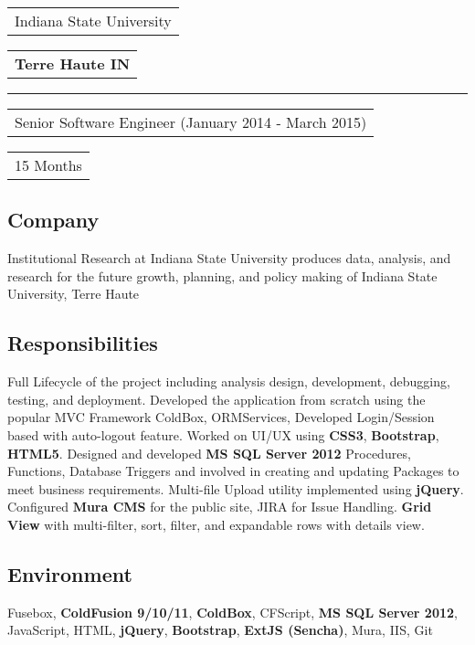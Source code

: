 \documentclass[letterpaper,11pt]{article}
\begin{document}
    \vspace{1.27cm}
    \noindent
    \begin{tabular}[t]{@{}l}
    \Large{Indiana State University}
    \end{tabular}
    \hfill
    \begin{tabular}[t]{l@{}}
    \textbf{Terre Haute IN}
    \end{tabular}
    \noindent\rule{\textwidth}{0.5pt}
    \begin{tabular}[t]{@{}l}
    Senior Software Engineer (January 2014 - March 2015)
    \end{tabular}
    \hfill
    \begin{tabular}[t]{l@{}}
    15 Months
    \end{tabular}

    \subsection{Company}
    Institutional Research at Indiana State University produces data, analysis, and research for the future growth, planning, and policy making of Indiana State University, Terre Haute

    \subsection{Responsibilities}
    Full Lifecycle of the project including analysis design, development, debugging, testing, and deployment. Developed the application from scratch using the popular MVC Framework ColdBox, ORMServices, Developed Login/Session based with auto-logout feature. Worked on UI/UX using \textbf{CSS3}, \textbf{Bootstrap}, \textbf{HTML5}. Designed and developed \textbf{MS SQL Server 2012} Procedures, Functions, Database Triggers and involved in creating and updating Packages to meet business requirements. Multi-file Upload utility implemented using \textbf{jQuery}. Configured \textbf{Mura CMS} for the public site, JIRA for Issue Handling. \textbf{Grid View} with multi-filter, sort, filter, and expandable rows with details view.

    \subsection{Environment}
    Fusebox, \textbf{ColdFusion 9/10/11}, \textbf{ColdBox}, CFScript, \textbf{MS SQL Server 2012}, JavaScript, HTML, \textbf{jQuery}, \textbf{Bootstrap}, \textbf{ExtJS (Sencha)}, Mura, IIS, Git
\end{document}

